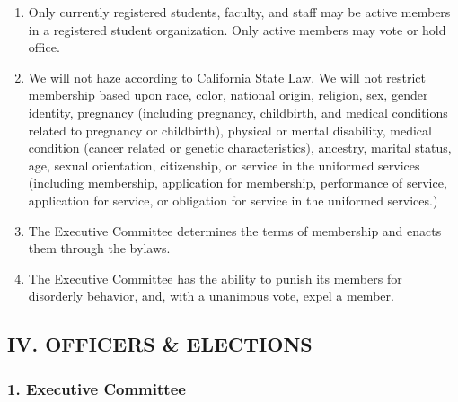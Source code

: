 \documentclass[
]{article}
\providecommand{\tightlist}{%
  \setlength{\itemsep}{0pt}\setlength{\parskip}{0pt}}
\begin{document}
\begin{enumerate}
\def\labelenumi{\arabic{enumi}.}
\tightlist
\item
  Only currently registered students, faculty, and staff may be active
  members in a registered student organization. Only active members may
  vote or hold office.
\item
  We will not haze according to California State Law. We will not
  restrict membership based upon race, color, national origin, religion,
  sex, gender identity, pregnancy (including pregnancy, childbirth, and
  medical conditions related to pregnancy or childbirth), physical or
  mental disability, medical condition (cancer related or genetic
  characteristics), ancestry, marital status, age, sexual orientation,
  citizenship, or service in the uniformed services (including
  membership, application for membership, performance of service,
  application for service, or obligation for service in the uniformed
  services.)
\item
  The Executive Committee determines the terms of membership and enacts
  them through the bylaws.
\item
  The Executive Committee has the ability to punish its members for
  disorderly behavior, and, with a unanimous vote, expel a member.
\end{enumerate}

\hypertarget{iv.-officers-elections}{%
\subsection{IV. OFFICERS \& ELECTIONS}\label{iv.-officers-elections}}

\hypertarget{executive-committee}{%
\subsubsection{1. Executive Committee}\label{executive-committee}}
\end{document}

